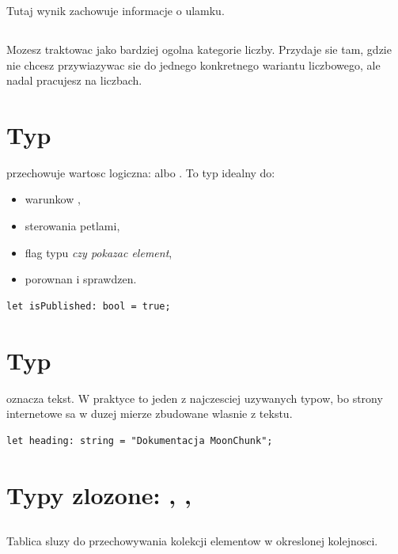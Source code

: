 Tutaj wynik zachowuje informacje o ulamku.

\subsection*{}
Mozesz traktowac  jako bardziej ogolna kategorie liczby. Przydaje sie tam,
gdzie nie chcesz przywiazywac sie do jednego konkretnego wariantu liczbowego,
ale nadal pracujesz na liczbach.

\section{Typ }
 przechowuje wartosc logiczna:  albo . To typ idealny do:

\begin{itemize}
  \item warunkow ,
  \item sterowania petlami,
  \item flag typu \emph{czy pokazac element},
  \item porownan i sprawdzen.
\end{itemize}

\begin{lstlisting}[style=moonchunk,caption={Przyklad zmiennej logicznej}]
let isPublished: bool = true;
\end{lstlisting}

\section{Typ }
 oznacza tekst. W praktyce to jeden z najczesciej uzywanych typow, bo strony
internetowe sa w duzej mierze zbudowane wlasnie z tekstu.

\begin{lstlisting}[style=moonchunk,caption={Przyklad tekstu}]
let heading: string = "Dokumentacja MoonChunk";
\end{lstlisting}

\section{Typy zlozone: , , }
\subsection*{}
Tablica sluzy do przechowywania kolekcji elementow w okreslonej kolejnosci.

